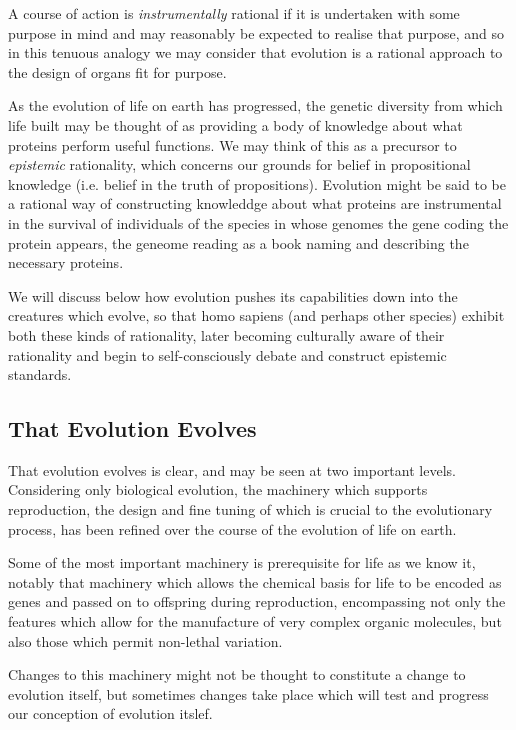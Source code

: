 A course of action is \emph{instrumentally} rational if it is undertaken with some purpose in mind and may reasonably be expected to realise that purpose, and so in this tenuous analogy we may consider that evolution is a rational approach to the design of organs fit for purpose.

As the evolution of life on earth has progressed, the genetic diversity from which life built may be thought of as providing a body of knowledge about what proteins perform useful functions.
We may think of this as a precursor to \emph{epistemic} rationality, which concerns our grounds for belief in propositional knowledge (i.e. belief in the truth of propositions).
Evolution might be said to be a rational way of constructing knowleddge about what proteins are instrumental in the survival of individuals of the species in whose genomes the gene coding the protein appears, the geneome reading as a book naming and describing the necessary proteins.

We will discuss below how evolution pushes its capabilities down into the creatures which evolve, so that homo sapiens (and perhaps other species) exhibit both these kinds of rationality, later becoming culturally aware of their rationality and begin to self-consciously debate and construct epistemic standards.

\subsection{That Evolution Evolves}

That evolution evolves is clear, and may be seen at two important levels.
Considering only biological evolution, the machinery which supports reproduction, the design and fine tuning of which is crucial to the evolutionary process, has been refined over the course of the evolution of life on earth.

Some of the most important machinery is prerequisite for life as we know it, notably that machinery which allows the chemical basis for life to be encoded as genes and passed on to offspring during reproduction, encompassing not only the features which allow for the manufacture of very complex organic molecules, but also those which permit non-lethal variation.

Changes to this machinery might not be thought to constitute a change to evolution itself, but sometimes changes take place which will test and progress our conception of evolution itslef.

